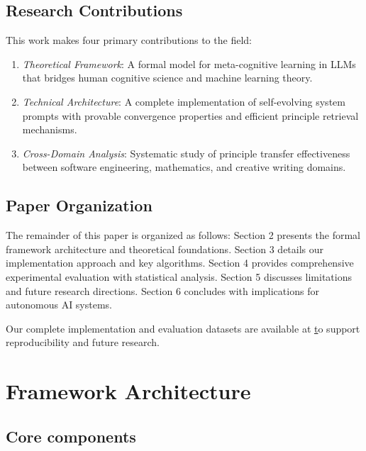 \documentclass[10pt,a4paper,twocolumn]{article}
\begin{document}
\subsection{Research Contributions}

This work makes four primary contributions to the field:

\begin{enumerate}
\item \textit{Theoretical Framework}: A formal model for meta-cognitive learning in LLMs that bridges human cognitive science and machine learning theory.

\item \textit{Technical Architecture}: A complete implementation of self-evolving system prompts with provable convergence properties and efficient principle retrieval mechanisms.

\item \textit{Cross-Domain Analysis}: Systematic study of principle transfer effectiveness between software engineering, mathematics, and creative writing domains.
\end{enumerate}


\subsection{Paper Organization}

The remainder of this paper is organized as follows: Section 2 presents the formal framework architecture and theoretical foundations. Section 3 details our implementation approach and key algorithms. Section 4 provides comprehensive experimental evaluation with statistical analysis. Section 5 discusses limitations and future research directions. Section 6 concludes with implications for autonomous AI systems.

Our complete implementation and evaluation datasets are available at \href{https://github.com/yarenty/prompt\_learning} to support reproducibility and future research.





\section{{Framework Architecture} }



\subsection{Core components}
\end{document}
